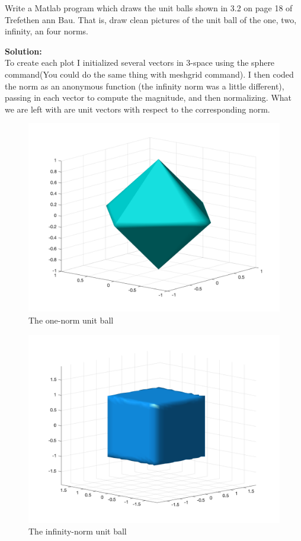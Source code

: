 \documentclass[12pt]{article}
\makeatletter
\theoremstyle{homework}
\newenvironment{exercise}[1]
{\def\@currentlabel{#1}\exercisecore}
{\endexercisecore}
\newcommand{\localhead}[1]{\par\smallskip\noindent\textbf{#1}\nobreak\\}%
\newcommand\solution{\localhead{Solution:}}
\makeatother
\begin{document}
\begin{exercise}{P7} Write a Matlab program which draws the unit balls shown in 3.2 on page 18 of Trefethen
  ann Bau. That is, draw clean pictures of the unit ball of the one, two, infinity, an four norms. \\
  \solution To create each plot I initialized several vectors in 3-space using the 
  sphere command(You could do the same thing with meshgrid command).
  I then coded the norm as an anonymous function (the infinity norm was a little different),
  passing in each vector to compute the magnitude, and then normalizing. What we are left with are unit vectors with respect
  to the corresponding norm. 
  \begin{figure}[H]
    \begin{center}
      \caption{The one-norm unit ball}
      \includegraphics[width=.76\textwidth]{1norm.png}
    \end{center}
  \end{figure}
  \begin{figure}[H]
    \begin{center}
      \caption{The infinity-norm unit ball}
      \includegraphics[width=.76\textwidth]{InfNorm.png}

\end{center}
\end{figure}
\end{exercise}
\end{document}
